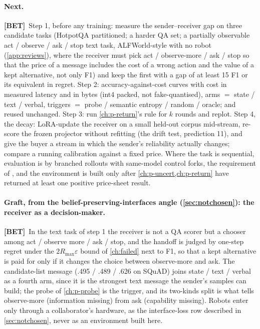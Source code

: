 \documentclass[11pt,a4paper]{report}
\newcommand{\BET}{\textcolor{betc}{\textbf{\scriptsize[BET]}}}
\begin{document}
\paragraph{Next.} \BET\ Step 1, before any training: measure the sender--receiver gap on three candidate tasks (HotpotQA partitioned; a harder QA set; a partially observable act / observe / ask / stop text task, ALFWorld-style with no robot (\cref{app:reviews}), where the receiver must pick act / observe-more / ask / stop so that the price of a message includes the cost of a wrong action and the value of a kept alternative, not only F1) and keep the first with a gap of at least 15 F1 or its equivalent in regret. Step 2: accuracy-against-cost curves with cost in measured latency and in bytes (int4 packed, not fake-quantised), arms $=$ state / text / verbal, triggers $=$ probe / semantic entropy / random / oracle;  and  reused unchanged. Step 3: run \cref{ch:p-return}'s rule for $k$ rounds and replot. Step 4, the decay: LoRA-update the receiver on a small held-out corpus mid-stream, re-score the frozen projector without refitting (the drift test, prediction 11), and give the buyer a stream in which the sender's reliability actually changes; compare a running calibration against a fixed price. Where the task is sequential, evaluation is by branched rollouts with same-model control forks, the requirement of \citet{2608.08239}, and the environment is built only after \cref{ch:p-uncert,ch:p-return} have returned at least one positive price-sheet result.

\paragraph{Graft, from the belief-preserving-interfaces angle (\cref{sec:notchosen}): the receiver as a decision-maker.} \BET\ In the text task of step 1 the receiver is not a QA scorer but a chooser among act / observe more / ask / stop, and the handoff is judged by one-step regret under the $2 R_{\max} \varepsilon$ bound of \cref{ch:failed} next to F1, so that a kept alternative is paid for only if it changes the choice between observe-more and ask. The candidate-list message (.495 / .489 / .626 on SQuAD) joins state / text / verbal as a fourth arm, since it is the strongest text message the sender's samples can build; the probe of \cref{ch:p-probe} is the trigger, and its two-kinds split is what tells observe-more (information missing) from ask (capability missing). Robots enter only through a collaborator's hardware, as the interface-loss row described in \cref{sec:notchosen}, never as an environment built here.
\end{document}
